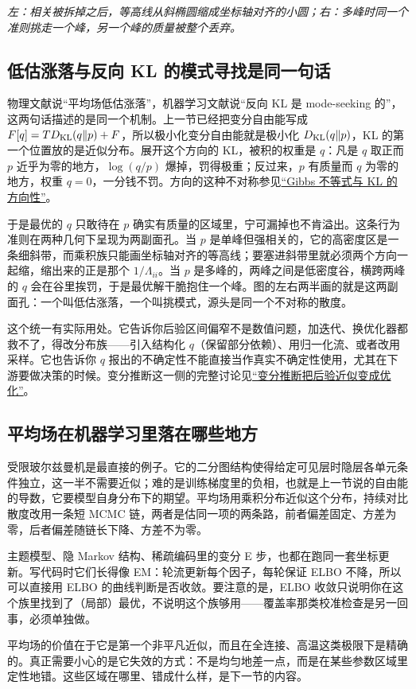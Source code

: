 \emph{左：相关被拆掉之后，等高线从斜椭圆缩成坐标轴对齐的小圆；右：多峰时同一个准则挑走一个峰，另一个峰的质量被整个丢弃。}

\subsection{低估涨落与反向 KL 的模式寻找是同一句话}

物理文献说``平均场低估涨落''，机器学习文献说``反向 KL 是 mode-seeking 的''，这两句话描述的是同一个机制。上一节已经把变分自由能写成 \(F[q]=TD_{\mathrm{KL}}(q\|p)+F\)，所以极小化变分自由能就是极小化 \(D_{\mathrm{KL}}(q\|p)\)，KL 的第一个位置放的是近似分布。展开这个方向的 KL，被积的权重是 \(q\)：凡是 \(q\) 取正而 \(p\) 近乎为零的地方，\(\log(q/p)\) 爆掉，罚得极重；反过来，\(p\) 有质量而 \(q\) 为零的地方，权重 \(q=0\)，一分钱不罚。方向的这种不对称参见\hyperref[sec:07-Information-Theory/03-Divergences/02]{``Gibbs 不等式与 KL 的方向性''}。

于是最优的 \(q\) 只敢待在 \(p\) 确实有质量的区域里，宁可漏掉也不肯溢出。这条行为准则在两种几何下呈现为两副面孔。当 \(p\) 是单峰但强相关的，它的高密度区是一条细斜带，而乘积族只能画坐标轴对齐的等高线；要塞进斜带里就必须两个方向一起缩，缩出来的正是那个 \(1/\Lambda_{ii}\)。当 \(p\) 是多峰的，两峰之间是低密度谷，横跨两峰的 \(q\) 会在谷里挨罚，于是最优解干脆抱住一个峰。图的左右两半画的就是这两副面孔：一个叫低估涨落，一个叫挑模式，源头是同一个不对称的散度。

这个统一有实际用处。它告诉你后验区间偏窄不是数值问题，加迭代、换优化器都救不了，得改分布族——引入结构化 \(q\)（保留部分依赖）、用归一化流、或者改用采样。它也告诉你 \(q\) 报出的不确定性不能直接当作真实不确定性使用，尤其在下游要做决策的时候。变分推断这一侧的完整讨论见\hyperref[sec:13-Machine-Learning/08-Sampling-and-Inference/03]{``变分推断把后验近似变成优化''}。

\subsection{平均场在机器学习里落在哪些地方}

受限玻尔兹曼机是最直接的例子。它的二分图结构使得给定可见层时隐层各单元条件独立，这一半不需要近似；难的是训练梯度里的负相，也就是上一节说的自由能的导数，它要模型自身分布下的期望。平均场用乘积分布近似这个分布，持续对比散度改用一条短 MCMC 链，两者是估同一项的两条路，前者偏差固定、方差为零，后者偏差随链长下降、方差不为零。

主题模型、隐 Markov 结构、稀疏编码里的变分 E 步，也都在跑同一套坐标更新。写代码时它们长得像 EM：轮流更新每个因子，每轮保证 ELBO 不降，所以可以直接用 ELBO 的曲线判断是否收敛。要注意的是，ELBO 收敛只说明你在这个族里找到了（局部）最优，不说明这个族够用——覆盖率那类校准检查是另一回事，必须单独做。

平均场的价值在于它是第一个非平凡近似，而且在全连接、高温这类极限下是精确的。真正需要小心的是它失效的方式：不是均匀地差一点，而是在某些参数区域里定性地错。这些区域在哪里、错成什么样，是下一节的内容。
